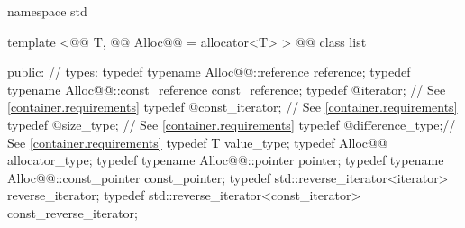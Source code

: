 \documentclass[american,twoside]{book}
\begin{document}
\begin{codeblock}
namespace std {
  template <@@ T, @@ Alloc@@ = allocator<T> >
  @@
  class list {
  public:
    // types:
    typedef typename Alloc@@::reference         reference;
    typedef typename Alloc@@::const_reference   const_reference;
    typedef @\impdef@                iterator;       // See \ref{container.requirements}
    typedef @\impdef@                const_iterator; // See \ref{container.requirements}
    typedef @\impdef@                size_type;      // See \ref{container.requirements}
    typedef @\impdef@                difference_type;// See \ref{container.requirements}
    typedef T                                     value_type;
    typedef Alloc@@                             allocator_type;
    typedef typename Alloc@@::pointer           pointer;
    typedef typename Alloc@@::const_pointer     const_pointer;
    typedef std::reverse_iterator<iterator>       reverse_iterator;
    typedef std::reverse_iterator<const_iterator> const_reverse_iterator;

}}
\end{codeblock}
\end{document}
